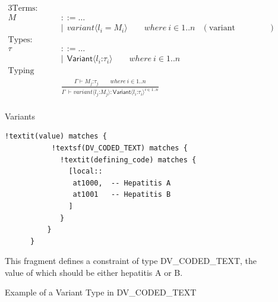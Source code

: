 \documentclass[preprint,3p,onecolumn,times,review]{article}
\begin{document}
{\begin{enumerate}
\begin{figure}[!htbp]
\begin{alignat}{3}
  \text{Terms:} \qquad   \nonumber\\
                        M~& {::= \dots } \nonumber\\
                          & | ~~ variant\langle l_i = M_i \rangle \qquad where~i \in 1..n & (\text{variant construction}) \label{eqn:variant_construction}\\
  \text{Types:} \qquad   \nonumber\\
                        \tau~ & {::= \dots} \nonumber\\
                              & |~~ \mathsf{Variant}\langle  l_i \text{:} \tau_i \rangle \qquad where~i \in 1..n \\
  \text{Typing rules:} \qquad   \nonumber\\
                           & \frac{\Gamma \vdash M_j\text{:}\tau_j \qquad where~i \in 1..n}
                                  {\Gamma ~ \vdash variant\langle l_j\text{:} M_j\rangle: \mathsf{Variant}\langle l_i \text{:} \tau_i\rangle^{i \in 1..n} } \label{eqn:variant_constructiontyping_rule} \\[6pt]
\end{alignat}
\caption{Variants}\label{fig:variant_type}
\end{figure}


\begin{figure}[!htbp]
\begin{minipage}{1.0\linewidth}
\begin{Verbatim}[frame=single,fontsize=\small, commandchars=!\(\)]
       !textit(value) matches {
           !textsf(DV_CODED_TEXT) matches {
             !textit(defining_code) matches {
               [local::
                at1000,  -- Hepatitis A
                at1001   -- Hepatitis B
               ]
             }
          }
      }
\end{Verbatim}
\end{minipage}
  \caption{Example of a Variant Type in DV\_CODED\_TEXT}\label{fig:example_variant_type}
  {\footnotesize
    This fragment defines a constraint of type DV\_CODED\_TEXT, the value of which should be either hepatitis A or B.
  }
\end{figure}


\end{enumerate}}
\end{document}
